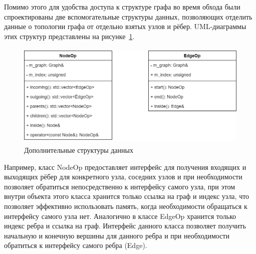 Помимо этого для удобства доступа к структуре графа во время обхода были спроектированы две вспомогательные структуры данных, позволяющих отделить данные о топологии графа от отдельно взятых узлов и рёбер. UML-диаграммы этих структур представлены на рисунке~\ref{fig:additionalGraphStructure}.
\begin{figure}[!ht]
    \centering
    \includegraphics[height=5cm]{figures/structure_additional.png}
    \caption{Дополнительные структуры данных}
    \label{fig:additionalGraphStructure}
\end{figure}

Например, класс \textsf{NodeOp} предоставляет интерфейс для получения входящих и выходящих рёбер для конкретного узла, соседних узлов и при необходимости позволяет обратиться непосредственно к интерфейсу самого узла, при этом внутри объекта этого класса хранится только ссылка на граф и индекс узла, что позволяет эффективно использовать память, когда необходимости обращаться к интерфейсу самого узла нет. Аналогично в классе \textsf{EdgeOp} хранится только индекс ребра и ссылка на граф. Интерфейс данного класса позволяет получить начальную и конечную вершины для данного ребра и при необходимости обратиться к интерфейсу самого ребра (\textsf{Edge}).

